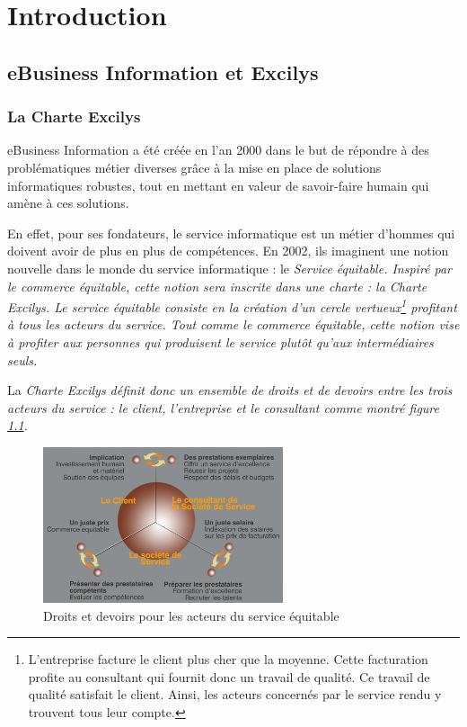 \chapter{Introduction}
\section{eBusiness Information et Excilys}

\subsection{La Charte Excilys}
eBusiness Information a été créée en l'an 2000 dans le but de répondre à des problématiques métier diverses grâce à la mise en place de solutions informatiques robustes, tout en mettant en valeur de savoir-faire humain qui amène à ces solutions.

En effet, pour ses fondateurs, le service informatique est un métier d'hommes qui doivent avoir de plus en plus de compétences. En 2002, ils imaginent une notion nouvelle dans le monde du service informatique : le \em{Service équitable}\cite{www_excilys}. Inspiré par le commerce équitable, cette notion sera inscrite dans une charte : la \em{Charte Excilys}. Le service équitable consiste en la création d'un cercle vertueux\footnote{L'entreprise facture le client plus cher que la moyenne. Cette facturation profite au consultant qui fournit donc un travail de qualité. Ce travail de qualité satisfait le client. Ainsi, les acteurs concernés par le service rendu y trouvent tous leur compte.} profitant à tous les acteurs du service. Tout comme le commerce équitable, cette notion vise à profiter aux personnes qui produisent le service plutôt qu'aux intermédiaires seuls.

La \em{Charte Excilys} définit donc un ensemble de droits et de devoirs entre les trois acteurs du service : le client, l'entreprise et le consultant comme montré figure \ref{droits_devoirs}.

\begin{figure}[h]
\begin{center}
\includegraphics[width=200pt]{img/droits_devoirs.jpg}
\end{center}
\caption{Droits et devoirs pour les acteurs du service équitable}
\label{droits_devoirs}
\end{figure}

